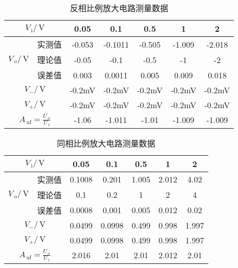 \documentclass{ctexart}
\renewcommand{\rm}{\,\mathrm}
\begin{document}
	\begin{table}[htbp]
		\centering
		\caption{反相比例放大电路测量数据}
	  	\begin{tabular}{|c|c|c|c|c|c|c|}
	  	\hline
	  	\multicolumn{2}{|c|}{$V_{\rm{i}}/\rm{V}$} & 0.05  & 0.1   & 0.5   & 1     & 2 \\
	  	\hline
	  	\multirow{3}{*}{$V_{\rm{o}}/\rm{V}$} & 实测值   & -0.053 & -0.1011 & -0.505 & -1.009 & -2.018 \\
  	\cline{2-7}          & 理论值   & -0.05 & -0.1  & -0.5  & -1    & -2 \\
  	\cline{2-7}          & 误差值   & 0.003 & 0.0011 & 0.005 & 0.009 & 0.018 \\
	 	 \hline
		  \multicolumn{2}{|c|}{$V_{-}/\rm{V}$} & -0.2mV & -0.2mV & -0.2mV & -0.2mV & -0.2mV \\
	 	 \hline
	  	\multicolumn{2}{|c|}{$V_{+}/\rm{V}$} & -0.2mV & -0.2mV & -0.2mV & -0.2mV & -0.2mV \\
	  	\hline
	  	\multicolumn{2}{|c|}{$A_{\rm{uf}}=\frac{U_{\rm{o}}}{U_{\rm{i}}}$} & -1.06 & -1.011 & -1.01 & -1.009 & -1.009 \\
	  	\hline
	  	\end{tabular}%
	  \end{table}%
	\begin{table}[htbp]
		\centering
		\caption{同相比例放大电路测量数据}
	  	\begin{tabular}{|c|c|c|c|c|c|c|}
		  \hline
		  \multicolumn{2}{|c|}{$V_{\rm{i}}/\rm{V}$} & 0.05  & 0.1   & 0.5   & 1     & 2 \\
		  \hline
	 	 \multirow{3}{*}{$V_{\rm{o}}/\rm{V}$} & 实测值   & 0.1008 & 0.201 & 1.005 & 2.012 & 4.02 \\
  	\cline{2-7}          & 理论值   & 0.1   & 0.2   & 1     & 2     & 4 \\
  	\cline{2-7}          & 误差值   & 0.0008 & 0.001 & 0.005 & 0.012 & 0.02 \\
	  	\hline
	 	 \multicolumn{2}{|c|}{$V_{-}/\rm{V}$} & 0.0499 & 0.0998 & 0.499 & 0.998 & 1.997 \\
	  	\hline
	  	\multicolumn{2}{|c|}{$V_{+}/\rm{V}$} & 0.0499 & 0.0998 & 0.499 & 0.998 & 1.997 \\
	  	\hline
	  	\multicolumn{2}{|c|}{$A_{\rm{uf}}=\frac{U_{\rm{o}}}{U_{\rm{i}}}$} & 2.016 & 2.01  & 2.01  & 2.012 & 2.01 \\
	  	\hline
	  	\end{tabular}%
 	\end{table}%
\end{document}
